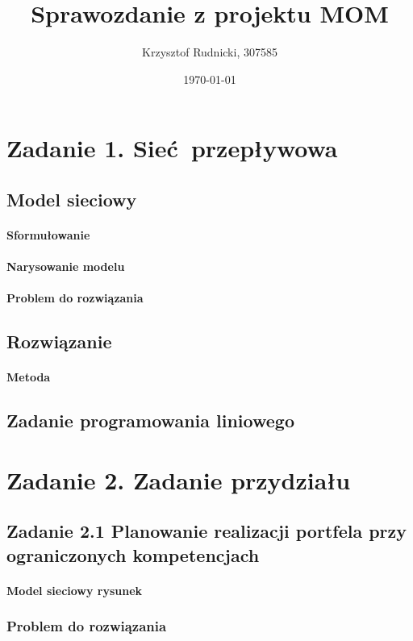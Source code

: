 \documentclass[12pt]{article}
\title{Sprawozdanie z projektu MOM}
\author{Krzysztof Rudnicki, 307585}
\date{\today}
\begin{document}
\maketitle
\section{Zadanie 1. Sieć przepływowa}
\subsection{Model sieciowy}
\paragraph{Sformułowanie}
\paragraph{Narysowanie modelu}
\paragraph{Problem do rozwiązania}

\subsection{Rozwiązanie}
\paragraph{Metoda }


\subsection{Zadanie programowania liniowego}

\section{Zadanie 2. Zadanie przydziału}
\subsection{Zadanie 2.1 Planowanie realizacji portfela przy ograniczonych kompetencjach}
\paragraph{Model sieciowy rysunek}
\subsubsection{Problem do rozwiązania}
\end{document}
